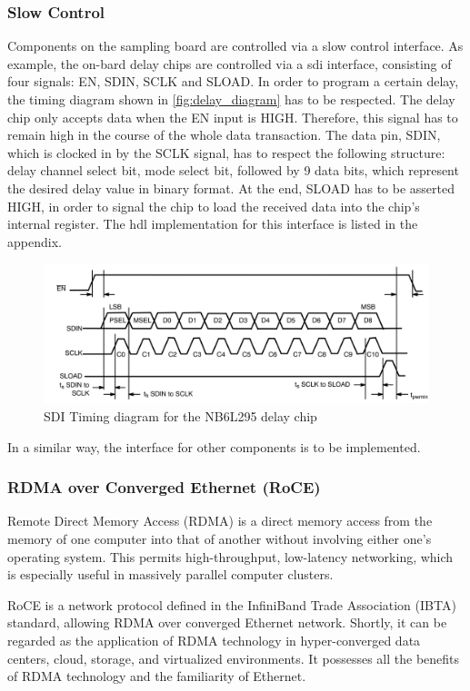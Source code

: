 \subsubsection*{Slow Control}
Components on the sampling board are controlled via a slow control interface. 
As example, the on-bard delay chips are controlled via a \gls{sdi} interface, consisting of four signals: EN, SDIN, SCLK and SLOAD. 
In order to program a certain delay, the timing diagram shown in \autoref{fig:delay_diagram} has to be respected.
The delay chip only accepts data when the EN input is HIGH. 
Therefore, this signal has to remain high in the course of the whole data transaction. 
The data pin, SDIN, which is clocked in by the SCLK signal, has to respect the following structure: delay channel select bit, mode select bit, followed by 9 data bits, which represent the desired delay value in binary format.
At the end, SLOAD has to be asserted HIGH, in order to signal the chip to load the received data into the chip's internal register.
The \gls{hdl} implementation for this interface is listed in the appendix.
\begin{figure}[tbh]
	\centering
	\includegraphics[width = \textwidth]{chap/04-work/img/sdi_interface_delay}
	\caption{SDI Timing diagram for the NB6L295 delay chip \cite{NB6L295}}
	\label{fig:delay_diagram}
\end{figure}
In a similar way, the interface for other components is to be implemented.

\subsubsection*{RDMA over Converged Ethernet (RoCE)}
Remote Direct Memory Access (RDMA) is a direct memory access from the memory of one computer into that of another without involving either one's operating system. This permits high-throughput, low-latency networking, which is especially useful in massively parallel computer clusters.

RoCE is a network protocol defined in the InfiniBand Trade Association (IBTA) standard, allowing RDMA over converged Ethernet network. Shortly, it can be regarded as the application of RDMA technology in hyper-converged data centers, cloud, storage, and virtualized environments. 
It possesses all the benefits of RDMA technology and the familiarity of Ethernet.

